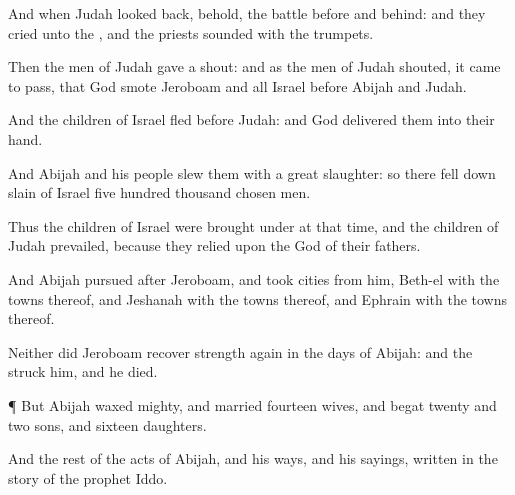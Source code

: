 {And when
Judah looked
back, behold, the
battle
{}
before and
behind: and they
cried unto the
{}, and the
priests
sounded with the
trumpets.

Then the
men of
Judah gave a
shout: and as the
men of
Judah
shouted, it came to pass, that
God
smote
Jeroboam and all
Israel
before
Abijah and
Judah.

And the
children of
Israel
fled
before
Judah: and
God
delivered them into their
hand.

And
Abijah and his
people
slew them with a
great
slaughter: so there fell
down
slain of
Israel
five
hundred
thousand
chosen
men.

Thus the
children of
Israel were
brought under at that
time, and the
children of
Judah
prevailed, because they
relied upon the
{}
God of their
fathers.

And
Abijah
pursued
after
Jeroboam, and
took
cities from him,
Beth-el with the
towns thereof, and
Jeshanah with the
towns thereof, and
Ephrain with the
towns thereof.

Neither did
Jeroboam
recover
strength again in the
days of
Abijah: and the
{}
struck him, and he
died.


\par }{\PP {}¶ But
Abijah waxed
mighty, and
married
fourteen
wives, and
begat
twenty and
two
sons, and
sixteen
daughters.

And the
rest of the
acts of
Abijah, and his
ways, and his
sayings,
{}
written in the
story of the
prophet
Iddo.




\par }
